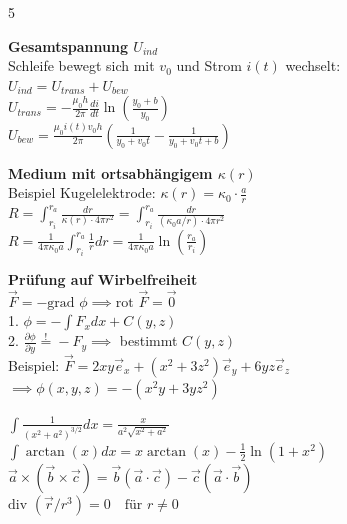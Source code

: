 \documentclass[a4paper, 2pt, landscape]{extarticle}
\begin{document}
\begin{multicols*}{5}
\begin{tcolorbox}[title={Induktion: Kombinierte Bewegung und Zeit (Blatt 7)}, colback=white, colframe=black]
\textbf{Gesamtspannung $U_{ind}$} \\
Schleife bewegt sich mit $v_0$ und Strom $i(t)$ wechselt: \\
$U_{ind} = U_{trans} + U_{bew}$ \\
$U_{trans} = -\frac{\mu_0 h}{2\pi} \frac{di}{dt} \ln\left(\frac{y_0+b}{y_0}\right)$ \\
$U_{bew} = \frac{\mu_0 i(t) v_0 h}{2\pi} \left( \frac{1}{y_0+v_0t} - \frac{1}{y_0+v_0t+b} \right)$
\end{tcolorbox}

\begin{tcolorbox}[title={Strömungsfeld: Spezifischer Widerstand (Blatt 5)}, colback=white, colframe=black]
\textbf{Medium mit ortsabhängigem $\kappa(r)$} \\
Beispiel Kugelelektrode: $\kappa(r) = \kappa_0 \cdot \frac{a}{r}$ \\
$R = \int_{r_i}^{r_a} \frac{dr}{\kappa(r) \cdot 4\pi r^2} = \int_{r_i}^{r_a} \frac{dr}{(\kappa_0 a / r) \cdot 4\pi r^2}$ \\
$R = \frac{1}{4\pi \kappa_0 a} \int_{r_i}^{r_a} \frac{1}{r} dr = \frac{1}{4\pi \kappa_0 a} \ln\left( \frac{r_a}{r_i} \right)$
\end{tcolorbox}

\begin{tcolorbox}[title={Vektoranalysis: Potentialbestimmung (Blatt 1)}, colback=white, colframe=black]
\textbf{Prüfung auf Wirbelfreiheit} \\
$\vec{F} = -\text{grad } \phi \implies \text{rot } \vec{F} = \vec{0}$ \\
1. $\phi = -\int F_x dx + C(y,z)$ \\
2. $\frac{\partial \phi}{\partial y} \stackrel{!}{=} -F_y \implies$ bestimmt $C(y,z)$ \\
Beispiel: $\vec{F} = 2xy \vec{e}_x + (x^2+3z^2) \vec{e}_y + 6yz \vec{e}_z$ \\
$\implies \phi(x,y,z) = -(x^2y + 3yz^2)$
\end{tcolorbox}

\begin{tcolorbox}[title={Mathematik: Integrale und Identitäten}, colback=white, colframe=black]
$\int \frac{1}{(x^2+a^2)^{3/2}} dx = \frac{x}{a^2 \sqrt{x^2+a^2}}$ \\
$\int \arctan(x) dx = x \arctan(x) - \frac{1}{2} \ln(1+x^2)$ \\
$\vec{a} \times (\vec{b} \times \vec{c}) = \vec{b}(\vec{a} \cdot \vec{c}) - \vec{c}(\vec{a} \cdot \vec{b})$ \\
$\text{div } ( \vec{r} / r^3 ) = 0 \quad \text{für } r \neq 0$
\end{tcolorbox}


\end{multicols*}
\end{document}
